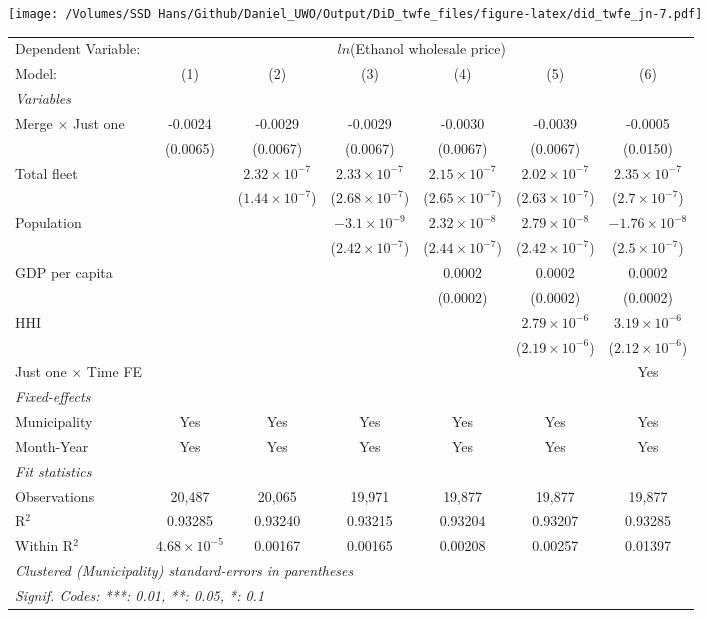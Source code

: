 \documentclass[
]{article}
\begin{document}
\texttt{[image: /Volumes/SSD Hans/Github/Daniel\_UWO/Output/DiD\_twfe\_files/figure-latex/did\_twfe\_jn-7.pdf]}

\begin{tabular}{lcccccc}
\tabularnewline\midrule\midrule
Dependent Variable:&\multicolumn{6}{c}{$ln$(Ethanol wholesale price)}\\
Model:&(1) & (2) & (3) & (4) & (5) & (6)\\
\midrule \emph{Variables}&   &   &   &   &   &  \\
Merge $\times $ Just one & -0.0024 & -0.0029 & -0.0029 & -0.0030 & -0.0039 & -0.0005\\
  &(0.0065) & (0.0067) & (0.0067) & (0.0067) & (0.0067) & (0.0150)\\
Total fleet &    & $2.32\times 10^{-7}$ & $2.33\times 10^{-7}$ & $2.15\times 10^{-7}$ & $2.02\times 10^{-7}$ & $2.35\times 10^{-7}$\\
  &   & ($1.44\times 10^{-7}$) & ($2.68\times 10^{-7}$) & ($2.65\times 10^{-7}$) & ($2.63\times 10^{-7}$) & ($2.7\times 10^{-7}$)\\
Population &    &    & $-3.1\times 10^{-9}$ & $2.32\times 10^{-8}$ & $2.79\times 10^{-8}$ & $-1.76\times 10^{-8}$\\
  &   &    & ($2.42\times 10^{-7}$) & ($2.44\times 10^{-7}$) & ($2.42\times 10^{-7}$) & ($2.5\times 10^{-7}$)\\
GDP per capita &    &    &    & 0.0002 & 0.0002 & 0.0002\\
  &   &    &    & (0.0002) & (0.0002) & (0.0002)\\
HHI &    &    &    &    & $2.79\times 10^{-6}$ & $3.19\times 10^{-6}$\\
  &   &    &    &    & ($2.19\times 10^{-6}$) & ($2.12\times 10^{-6}$)\\
Just one $\times$ Time FE &  &  &  &  &  & Yes\\
\midrule \emph{Fixed-effects}&   &   &   &   &   &  \\
Municipality & Yes & Yes & Yes & Yes & Yes & Yes\\
Month-Year & Yes & Yes & Yes & Yes & Yes & Yes\\
\midrule \emph{Fit statistics}&  & & & & & \\
Observations & 20,487&20,065&19,971&19,877&19,877&19,877\\
R$^2$ & 0.93285&0.93240&0.93215&0.93204&0.93207&0.93285\\
Within R$^2$ & $4.68\times 10^{-5}$&0.00167&0.00165&0.00208&0.00257&0.01397\\
\midrule\midrule\multicolumn{7}{l}{\emph{Clustered (Municipality) standard-errors in parentheses}}\\
\multicolumn{7}{l}{\emph{Signif. Codes: ***: 0.01, **: 0.05, *: 0.1}}\\
\end{tabular}
\end{document}
